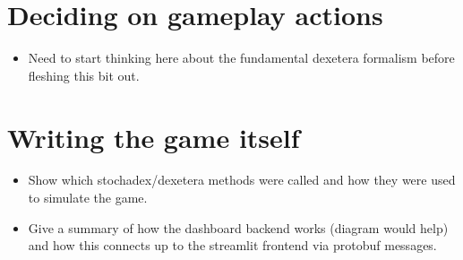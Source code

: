 \section{\sffamily Deciding on gameplay actions}


\begin{itemize}
\item{Need to start thinking here about the fundamental dexetera formalism before fleshing this bit out.}
\end{itemize}

\section{\sffamily Writing the game itself}

\begin{itemize}
\item{Show which stochadex/dexetera methods were called and how they were used to simulate the game.}
\item{Give a summary of how the dashboard backend works (diagram would help) and how this connects up to the streamlit frontend via protobuf messages.}
\end{itemize}